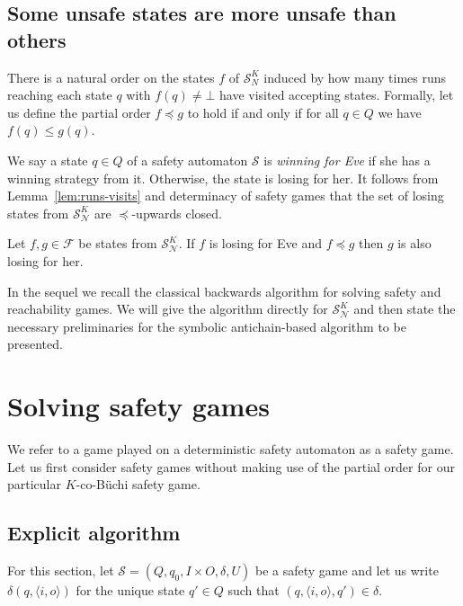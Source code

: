 \documentclass[runningheads,a4paper,draft]{llncs}
\newcommand{\eve}{Eve\xspace}
\newcommand{\calN}{\mathcal{N}}
\newcommand{\calS}{\mathcal{S}}
\begin{document}
\subsection{Some unsafe states are more unsafe than others}
There is a natural order on the states $f$ of $\calS^K_N$ induced by how many
times runs reaching each state $q$ with $f(q) \neq \bot$ have visited
accepting states. Formally, let us define the partial order $f \preceq g$
to hold if and only if for all $q \in Q$ we have $f(q) \leq g(q)$.

We say a state $q \in Q$ of a safety automaton $\calS$ is \emph{winning for
\eve} if she has a winning strategy from it. Otherwise, the state is losing
for her. It follows from Lemma~\ref{lem:runs-visits} and determinacy of safety
games that the set of losing states from $\calS^K_\calN$ are $\preceq$-upwards
closed.
\begin{proposition}
  Let $f,g \in \mathcal{F}$ be states from $\calS^K_\calN$. If $f$ is losing
  for \eve and $f \preceq g$ then $g$ is also losing for her.
\end{proposition}

In the sequel we recall the classical backwards algorithm for solving safety
and reachability games. We will give the algorithm directly for
$\calS^K_\calN$ and then state the necessary preliminaries for the symbolic
antichain-based algorithm to be presented.

\section{Solving safety games}
We refer to a game played on a deterministic safety automaton as a safety
game. Let us first consider safety games without making use of the partial
order for our particular $K$-co-B\"uchi safety game.

\subsection{Explicit algorithm}
For this section, let $\calS = (Q,q_0, I\times O, \delta, U)$ be a safety
game and let us write $\delta(q,\langle i, o \rangle)$ for the unique state
$q' \in Q$ such that $(q, \langle i, o \rangle, q') \in \delta$.
\end{document}
